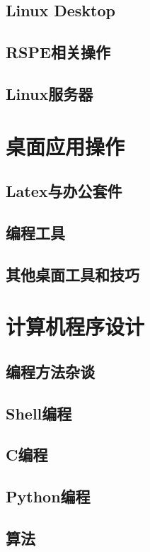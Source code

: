 \documentclass[11pt,a4paper]{report}
\begin{document}
\chapter{Linux Desktop}

\chapter{RSPE相关操作}

\chapter{Linux服务器}


\part{桌面应用操作}

\chapter{Latex与办公套件}

\chapter{编程工具}

\chapter{其他桌面工具和技巧}


\part{计算机程序设计}
\chapter{编程方法杂谈}

\chapter{Shell编程}

\chapter{C编程}

\chapter{Python编程}

\chapter{算法}



\end{document}
